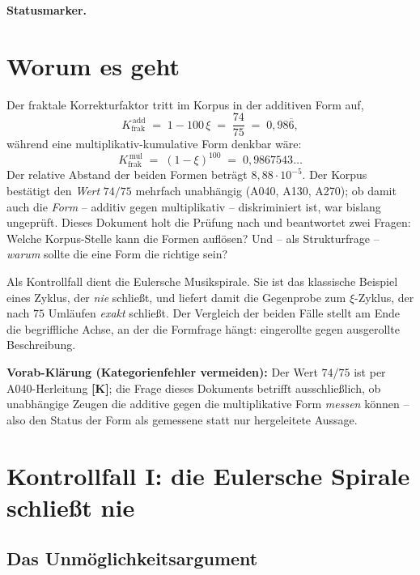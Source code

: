 
\medskip\noindent\textbf{Statusmarker.}


\section{Worum es geht}

Der fraktale Korrekturfaktor tritt im Korpus in der additiven Form auf,
\[
  K_\text{frak}^{\,\text{add}} \;=\; 1 - 100\,\xi \;=\; \frac{74}{75}
  \;=\; 0{,}98\overline{6},
\]
w\"ahrend eine multiplikativ-kumulative Form denkbar w\"are:
\[
  K_\text{frak}^{\,\text{mul}} \;=\; (1-\xi)^{100} \;=\; 0{,}9867543\ldots
\]
Der relative Abstand der beiden Formen betr\"agt $8{,}88\cdot10^{-5}$. Der
Korpus best\"atigt den \emph{Wert} $74/75$ mehrfach unabh\"angig (A040, A130,
A270); ob damit auch die \emph{Form} -- additiv gegen multiplikativ --
diskriminiert ist, war bislang ungepr\"uft. Dieses Dokument holt die Pr\"ufung
nach und beantwortet zwei Fragen: Welche Korpus-Stelle kann die Formen
aufl\"osen? Und -- als Strukturfrage -- \emph{warum} sollte die eine Form
die richtige sein?

Als Kontrollfall dient die Eulersche Musikspirale. Sie ist das klassische
Beispiel eines Zyklus, der \emph{nie} schlie\ss t, und liefert damit die
Gegenprobe zum $\xi$-Zyklus, der nach $75$ Uml\"aufen \emph{exakt} schlie\ss t.
Der Vergleich der beiden F\"alle stellt am Ende die begriffliche Achse, an der
die Formfrage h\"angt: eingerollte gegen ausgerollte Beschreibung.

\textbf{Vorab-Kl\"arung (Kategorienfehler vermeiden):} Der Wert $74/75$ ist per
A040-Herleitung \textbf{[K]}; die Frage dieses Dokuments betrifft
ausschlie\ss lich, ob unabh\"angige Zeugen die additive gegen die
multiplikative Form \emph{messen} k\"onnen -- also den Status der Form als
gemessene statt nur hergeleitete Aussage.

\section{Kontrollfall I: die Eulersche Spirale schlie\ss t nie}

\subsection{Das Unm\"oglichkeitsargument}

